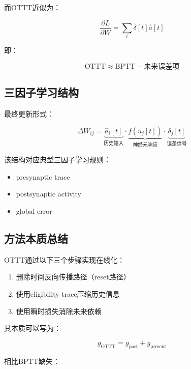 \documentclass[journal,12pt,onecolumn]{IEEEtran}
\begin{document}
而OTTT近似为：

\begin{equation}
\frac{\partial L}{\partial W}
=
\sum_{t}
\delta[t]\hat{a}[t]
\end{equation}

即：

\begin{equation}
\text{OTTT} \approx \text{BPTT} - \text{未来误差项}
\end{equation}



\subsection{三因子学习结构}

最终更新形式：

\begin{equation}
\Delta W_{ij} = \underbrace{\hat{a}_i[t]}_{\text{历史输入}} \cdot
\underbrace{f(u_j[t])}_{\text{神经元响应}} \cdot
\underbrace{\delta_j[t]}_{\text{误差信号}}
\end{equation}

该结构对应典型三因子学习规则：

\begin{itemize}
\item presynaptic trace
\item postsynaptic activity
\item global error
\end{itemize}



\subsection{方法本质总结}

OTTT通过以下三个步骤实现在线化：

\begin{enumerate}
\item 删除时间反向传播路径（reset路径）
\item 使用eligibility trace压缩历史信息
\item 使用瞬时损失消除未来依赖
\end{enumerate}

其本质可以写为：

\begin{equation}
g_{\text{OTTT}} = g_{\text{past}} + g_{\text{present}}
\end{equation}

相比BPTT缺失：
\end{document}
